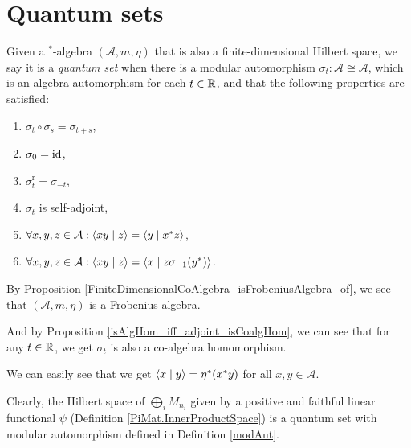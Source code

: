 \chapter{Quantum sets}

 \begin{definition}\label{QuantumSet}
  \leanok
  Given a $^*$-algebra $(\mathcal{A},m,\eta)$ that is also a finite-dimensional Hilbert space,
  we say it is a \textit{quantum set} when there is a modular automorphism $\sigma_t\colon\mathcal{A}\cong\mathcal{A}$, which is an algebra automorphism for each $t\in\mathbb{R}$, and that the following properties are satisfied:
  \begin{enumerate}
   \item $\sigma_t\circ\sigma_s=\sigma_{t+s}$,
   \item $\sigma_0=\operatorname{id}$,
   \item $\sigma_t^{\operatorname{r}}=\sigma_{-t}$,
   \item $\sigma_t$ is self-adjoint,
   \item $\forall{x,y,z}\in\mathcal{A}:\left\langle xy \mid z\right\rangle=\left\langle y \mid x^*z\right\rangle$,
   \item $\forall{x,y,z}\in\mathcal{A}:\left\langle xy \mid z\right\rangle=\left\langle x \mid z\sigma_{-1}(y^*)\right\rangle$.
  \end{enumerate}
  By Proposition \ref{FiniteDimensionalCoAlgebra_isFrobeniusAlgebra_of}, we see that $(\mathcal{A},m,\eta)$ is a Frobenius algebra.

  And by Proposition \ref{isAlgHom_iff_adjoint_isCoalgHom}, we can see that for any $t\in\mathbb{R}$, we get $\sigma_t$ is also a co-algebra homomorphism.

  We can easily see that we get $\left\langle x \mid y\right\rangle=\eta^*(x^*y)$ for all $x,y\in\mathcal{A}$.
 \end{definition}

 Clearly, the Hilbert space of $\bigoplus_iM_{n_i}$ given by a positive and faithful linear functional $\psi$ (Definition \ref{PiMat.InnerProductSpace}) is a quantum set with modular automorphism defined in Definition \ref{modAut}.
